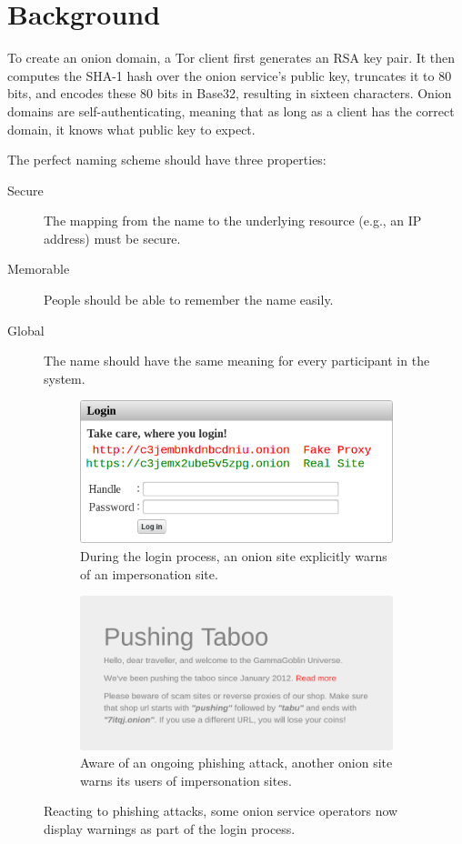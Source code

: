 \section{Background}
\label{sec:background}

To create an onion domain, a Tor client first generates an RSA key pair.  It
then computes the SHA-1 hash over the onion service's public key, truncates it
to 80 bits, and encodes these 80 bits in Base32, resulting in sixteen
characters.  Onion domains are self-authenticating, meaning that as long as a
client has the correct domain, it knows what public key to expect.

The perfect naming scheme should have three properties:
\begin{description}
    \item[Secure] The mapping from the name to the underlying resource (e.g., an
        IP address) must be secure.
    \item[Memorable] People should be able to remember the name easily.
    \item[Global] The name should have the same meaning for every participant
        in the system.
\end{description}

\begin{figure}
  \centering

  \begin{subfigure}[b]{\linewidth}
    \centering
    \includegraphics[width=0.7\linewidth]{figures/login-warning-1.png}
    \caption{During the login process, an onion site explicitly warns of an
    impersonation site.}
    \label{fig:login-warning-1}
  \end{subfigure}

  \begin{subfigure}[b]{\linewidth}
    \centering
    \includegraphics[width=0.8\linewidth]{figures/login-warning-2.png}
    \caption{Aware of an ongoing phishing attack, another onion site warns its
    users of impersonation sites.}
    \label{fig:login-warning-2}
  \end{subfigure}

  \caption{Reacting to phishing attacks, some onion service operators now
  display warnings as part of the login process.}
\end{figure}

